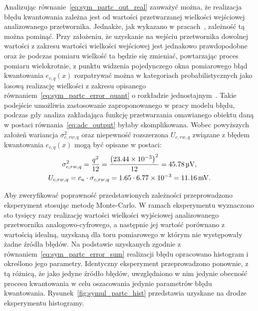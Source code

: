 Analizując równanie~\eqref{eq:sym_partc_out_real} zauważyć można, że realizacja błędu kwantowania zależna jest od wartości przetwarzanej wielkości wejściowej analizowanego przetwornika. Jednakże, jak wykazano w pracach~\cite{sienkowski_kwant, sienkowski_adc}, zależność tą można pominąć. Przy założeniu, że uzyskanie na wejściu przetwornika dowolnej wartości z zakresu wartości wielkości wejściowej jest jednakowo prawdopodobne oraz że podczas pomiaru wielkość ta będzie się zmieniać, powtarzając proces pomiaru wielokrotnie, z punktu widzenia pojedynczego okna pomiarowego błąd kwantowania $e_{c,q}(x)$ rozpatrywać można w kategoriach probabilistycznych jako losową realizację wielkości z zakresu opisanego równaniem~\eqref{eq:sym_partc_error_quant} o rozkładzie jednostajnym~\cite{jakubiec_system}. Takie podejście umożliwia zastosowanie zaproponowanego w pracy modelu błędu, podczas gdy analiza zakładająca funkcję przetwarzania omawianego obiektu daną w postaci równania~\eqref{eq:adc_output} byłaby skomplikowana. Wobec powyższych założeń wariancja $\sigma_{c,rw,q}^{2}$ oraz niepewność rozszerzona $U_{c,rw,q}$ związane z błędem kwantowania $e_{c,q}(x)$ mogą być opisane w postaci:
\begin{gather}
\sigma_{c,rw,q}^{2} = \frac{ q^{2}}{12} = \frac{\left(\num{23.44e-3}\right)^{2} }{12} = \qty{45.78}{\micro V} \label{eq:sym_partc_var_quant}, \\
U_{c,rw,q} = c_{u} \cdot \sigma_{c,rw,q} = 1.65 \cdot \num{6.77e-3} = \qty{11.16}{mV} \label{eq:sym_partc_uncert_quant}.
\end{gather}

Aby zweryfikować poprawność przedstawionych zależności przeprowadzono eksperyment stosując metodę Monte-Carlo. W ramach eksperymentu wyznaczono sto tysięcy razy realizację wartości wielkości wyjściowej analizowanego przetwornika analogowo-cyfrowego, a następnie jej wartość porównano z wartością idealną, uzyskaną dla toru pomiarowego w którym nie występowały żadne źródła błędów. Na podstawie uzyskanych zgodnie z równaniem~\eqref{eq:sym_partc_error_sum} realizacji błędu opracowano histogram i określono jego parametry. Identyczny eksperyment przeprowadzono ponownie, z tą różnicą, że jako jedyne źródło błędów, uwzględniono w nim jedynie obecność procesu kwantowania w celu oszacowania jedynie parametrów błędu kwantowania. Rysunek~\ref{fig:symul_partc_hist} przedstawia uzyskane na drodze eksperymentu histogramy.


